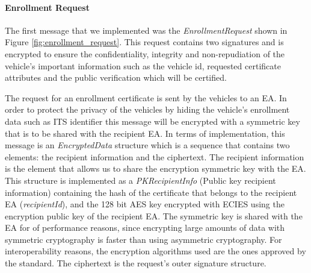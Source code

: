 \paragraph{Enrollment Request}
The first message that we implemented was the \textit{EnrollmentRequest} shown in Figure \ref{fig:enrollment_request}. This request contains two signatures and is encrypted to ensure the confidentiality, integrity and non-repudiation of the vehicle's important information such as the vehicle id, requested certificate attributes and the public verification which will be certified.

The request for an enrollment certificate is sent by the vehicles to an EA. In order to protect the privacy of the vehicles by hiding the vehicle's enrollment data such as ITS identifier this message will be encrypted with a symmetric key that is to be shared with the recipient EA. In terms of implementation, this message is an \textit{EncryptedData} structure which is a sequence that contains two elements: the recipient information and the ciphertext. The recipient information is the element that allows us to share the encryption symmetric key with the EA. This structure is implemented as a \textit{PKRecipientInfo} (Public key recipient information) containing the hash of the certificate that belongs to the recipient EA (\textit{recipientId}), and the 128 bit AES key encrypted with ECIES using the encryption public key of the recipient EA. The symmetric key is shared with the EA for of performance reasons, since encrypting large amounts of data with symmetric cryptography is faster than using asymmetric cryptography. For interoperability reasons, the encryption algorithms used are the ones approved by the standard. The ciphertext is the request's outer signature structure.

